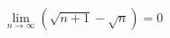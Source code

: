 \documentclass[preview]{standalone}
\begin{document}
\begin{align*}
\lim_{n\to\infty} \left( \sqrt{n+1} - \sqrt{n} \right) = 0
\end{align*}
\end{document}
